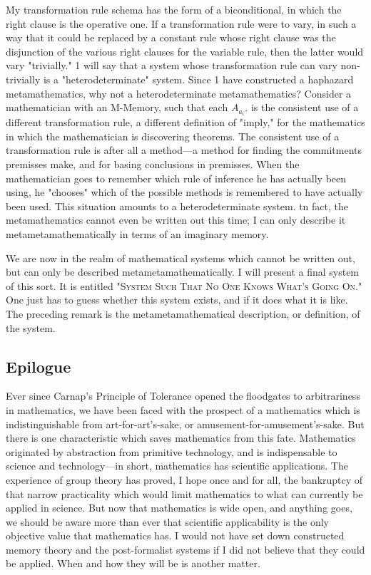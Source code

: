 \documentclass[10pt,twoside]{memoir}
\begin{document}
\begin{enumerate}
{\begin{enumerate}
\begin{sysrules}
\begin{sysrules}
\begin{sysrules}
\begin{sysrules}
My transformation rule schema has the form of a biconditional, in 
which the right clause is the operative one. If a transformation rule were to 
vary, in such a way that it could be replaced by a constant rule whose right 
clause was the disjunction of the various right clauses for the variable rule, 
then the latter would vary "trivially." 1 will say that a system whose 
transformation rule can vary non-trivially is a "heterodeterminate" system. 
Since 1 have constructed a haphazard metamathematics, why not a 
heterodeterminate metamathematics? Consider a mathematician with an 
M-Memory, such that each $A_{a_i}$. is the consistent use of a different 
transformation rule, a different definition of "imply," for the mathematics 
in which the mathematician is discovering theorems. The consistent use of a 
transformation rule is after all a method---a method for finding the 
commitments premisses make, and for basing conclusions in premisses. When 
the mathematician goes to remember which rule of inference he has actually 
been using, he "chooses" which of the possible methods is remembered to 
have actually been used. This situation amounts to a heterodeterminate 
system. tn fact, the metamathematics cannot even be written out this time; I 
can only describe it metametamathematically in terms of an imaginary 
memory. 

We are now in the realm of mathematical systems which cannot be 
written out, but can only be described metametamathematically. I will 
present a final system of this sort. It is entitled \textsc{"System Such That No One 
Knows What's Going On."} One just has to guess whether this system exists, 
and if it does what it is like. The preceding remark is the 
metametamathematical description, or definition, of the system. 

\subsection{Epilogue}

Ever since Carnap's Principle of Tolerance opened the floodgates to 
arbitrariness in mathematics, we have been faced with the prospect of a 
mathematics which is  indistinguishable from  art-for-art's-sake, or 
amusement-for-amusement's-sake. But there is one characteristic which saves 
mathematics from this fate. Mathematics originated by abstraction from 
primitive technology, and is indispensable to science and technology---in 
short, mathematics has scientific applications. The experience of group 
theory has proved, I hope once and for all, the bankruptcy of that narrow 
practicality which would limit mathematics to what can currently be applied 
in science. But now that mathematics is wide open, and anything goes, we 
should be aware more than ever that scientific applicability is the only 
objective value that mathematics has. I would not have set down constructed 
memory theory and the post-formalist systems if I did not believe that they 
could be applied. When and how they will be is another matter. 


\end{sysrules}
\end{sysrules}
\end{sysrules}
\end{sysrules}
\end{enumerate}}
\end{enumerate}
\end{document}
